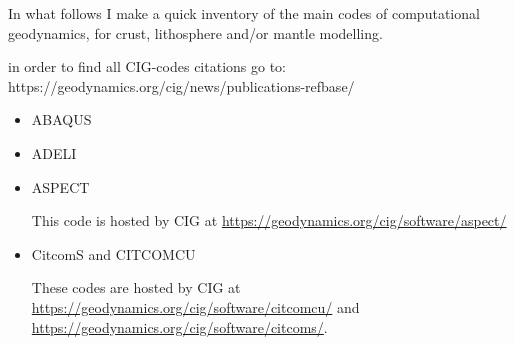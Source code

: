 
In what follows I make a quick inventory of the main codes of computational geodynamics, 
for crust, lithosphere and/or mantle modelling.

in order to find all CIG-codes citations go to: https://geodynamics.org/cig/news/publications-refbase/

\begin{itemize}

\item ABAQUS
\cite{gedh02}
\cite{kuhe09}
\cite{makh09}
\cite{nalr12}
\cite{pevp15}


\item ADELI
\cite{hajc97}
\cite{vech06} 
\cite{boht08a}
\cite{boht08b}
\cite{gech12}
\cite{gigh12}
\cite{wahd13}
\cite{ceag15}
\cite{cegm18}

\item ASPECT

This code is hosted by CIG at \url{https://geodynamics.org/cig/software/aspect/}

\cite{bahk07}
\cite{krhb12}
\cite{aupm15}
\cite{tosn15}
\cite{dahe16}
\cite{gadb16}
\cite{zhon16}
\cite{hepb17}
\cite{daef17}
\cite{hedg17}
\cite{robh17}
\cite{robu17}
\cite{aumh17}
\cite{thie17}
\cite{brsg17}
\cite{onmz17}
\cite{tasm17}
\cite{zhli17}
\cite{daga18}
\cite{onzh18}
\cite{gltf18}
\cite{heps18}
\cite{galh18}
\cite{peka18}
\cite{puth18}
\cite{brst18b}
\cite{baba19}
\cite{stbl19}
\cite{cocf19}
\cite{liki19}

\item CitcomS and CITCOMCU

These codes are hosted by CIG at \url{https://geodynamics.org/cig/software/citcomcu/}
and \url{https://geodynamics.org/cig/software/citcoms/}.

\cite{somo96}
\cite{moso98}
\cite{zhgm98}
\cite{vazh99}
\cite{zhzm00}
\cite{gumr00}
\cite{bigu01}
\cite{tagh02}
\cite{vhzh03}
\cite{cogu03}
\cite{bigu03}
\cite{solo04}
\cite{bihi05}
\cite{beck06}
\cite{pibf06}
\cite{tact06}
\cite{besb06}
\cite{coli06}
\cite{bihi07}
\cite{zhzl07}
\cite{magu07}
\cite{bavi07}
\cite{rimb07}
\cite{mofm07}
\cite{cobs07}
\cite{dihf08}
\cite{gamc08}
\cite{zhmt08}
\cite{hole08}
\cite{lizh09}
\cite{arhm09}
\cite{zhzm09}
\cite{anbi09}
\cite{fobe09}
\cite{bubi09}
\cite{bumb10}
\cite{wibh10}
\cite{baih10}
\cite{bubi10}
\cite{zhzl10}
\cite{befa11}
\cite{lemj11}
\cite{vaal11}
\cite{legu11}
\cite{list11}
\cite{jabi12}
\cite{bija12}
\cite{bova12}
\cite{hucf12}
\cite{zhym12}
\cite{solo12}
\cite{hibi12}
\cite{bogs13a}
\cite{bogs13b}
\cite{jabr13}
\cite{qula13}
\cite{oldh13}
\cite{arbi13}
\cite{cost13}
\cite{flgw14}
\cite{budt14}
\cite{kava14}
\cite{arfw14}
\cite{wavp14}
\cite{seki14}
\cite{agvg14}
\cite{mabv14}
\cite{zhu14}
\cite{bogf15}
\cite{bomv15}
\cite{sefw15}
\cite{daso15}
\cite{vami15}
\cite{wazh15}
\cite{wavp15}
\cite{waav15}
\cite{hafg15}
\cite{tarn15}
\cite{legu15}
\cite{welm16}
\cite{wele16}
\cite{maav17}
\cite{frbm17}
\cite{haja17}
\cite{hect18}
\cite{king18}
\cite{mavb19}


\end{itemize}
